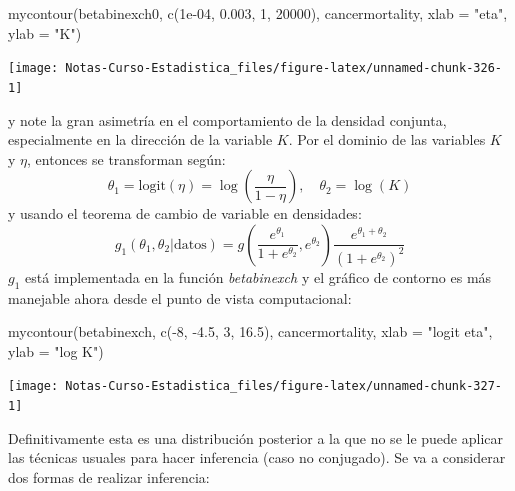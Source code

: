 \documentclass[
  12pt,
]{book}
\newenvironment{Shaded}{\begin{snugshade}}{\end{snugshade}}
\newcommand{\AttributeTok}[1]{\textcolor[rgb]{0.77,0.63,0.00}{#1}}
\newcommand{\DecValTok}[1]{\textcolor[rgb]{0.00,0.00,0.81}{#1}}
\newcommand{\FloatTok}[1]{\textcolor[rgb]{0.00,0.00,0.81}{#1}}
\newcommand{\FunctionTok}[1]{\textcolor[rgb]{0.00,0.00,0.00}{#1}}
\newcommand{\NormalTok}[1]{#1}
\newcommand{\SpecialCharTok}[1]{\textcolor[rgb]{0.00,0.00,0.00}{#1}}
\newcommand{\StringTok}[1]{\textcolor[rgb]{0.31,0.60,0.02}{#1}}
\theoremstyle{definition}
\theoremstyle{definition}
\theoremstyle{definition}
\theoremstyle{definition}
\theoremstyle{remark}
\begin{document}
\begin{Shaded}
\begin{Highlighting}[]
\FunctionTok{mycontour}\NormalTok{(betabinexch0, }\FunctionTok{c}\NormalTok{(}\FloatTok{1e{-}04}\NormalTok{, }\FloatTok{0.003}\NormalTok{, }\DecValTok{1}\NormalTok{, }\DecValTok{20000}\NormalTok{),}
\NormalTok{    cancermortality, }\AttributeTok{xlab =} \StringTok{"eta"}\NormalTok{, }\AttributeTok{ylab =} \StringTok{"K"}\NormalTok{)}
\end{Highlighting}
\end{Shaded}

\begin{center}\texttt{[image: Notas-Curso-Estadistica\_files/figure-latex/unnamed-chunk-326-1]} \end{center}

y note la gran asimetría en el comportamiento de la densidad conjunta, especialmente en la dirección de la variable \(K\). Por el dominio de las variables \(K\) y \(\eta\), entonces se transforman según:
\[\theta_1=\text{logit}(\eta)=\log\left(\frac{\eta}{1-\eta}\right),\quad  \theta_2=\log(K)\]
y usando el teorema de cambio de variable en densidades:
\[g_1(\theta_1,\theta_2|\text{datos})=g\left(\frac{e^{\theta_1}}{1+e^{\theta_2}},e^{\theta_2}\right)\frac{e^{\theta_1+\theta_2}}{(1+e^{\theta_2})^2}\]
\(g_1\) está implementada en la función \emph{betabinexch} y el gráfico de contorno es más manejable ahora desde el punto de vista computacional:

\begin{Shaded}
\begin{Highlighting}[]
\FunctionTok{mycontour}\NormalTok{(betabinexch, }\FunctionTok{c}\NormalTok{(}\SpecialCharTok{{-}}\DecValTok{8}\NormalTok{, }\SpecialCharTok{{-}}\FloatTok{4.5}\NormalTok{, }\DecValTok{3}\NormalTok{, }\FloatTok{16.5}\NormalTok{), cancermortality,}
    \AttributeTok{xlab =} \StringTok{"logit eta"}\NormalTok{, }\AttributeTok{ylab =} \StringTok{"log K"}\NormalTok{)}
\end{Highlighting}
\end{Shaded}

\begin{center}\texttt{[image: Notas-Curso-Estadistica\_files/figure-latex/unnamed-chunk-327-1]} \end{center}

Definitivamente esta es una distribución posterior a la que no se le puede aplicar las técnicas usuales para hacer inferencia (caso no conjugado). Se va a considerar dos formas de realizar inferencia:
\end{document}
